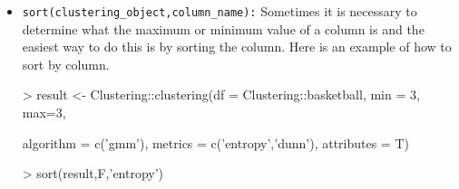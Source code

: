 \begin{itemize}
  \item \texttt{sort(clustering\_object,column\_name):} Sometimes it is necessary to determine what the maximum or minimum value of a column is and the easiest way to do this is by sorting the column. Here is an example of how to sort by column.
  \begin{Schunk}
\begin{Sinput}
> result <- Clustering::clustering(df = Clustering::basketball, min = 3, max=3,
\end{Sinput}
\begin{Sinput}
           algorithm = c('gmm'), metrics = c('entropy','dunn'), attributes = T)
 \end{Sinput}
\end{Schunk}
\begin{Schunk}
\begin{Sinput}
>  sort(result,F,'entropy')
\end{Sinput}
\end{Schunk}


\end{itemize}
